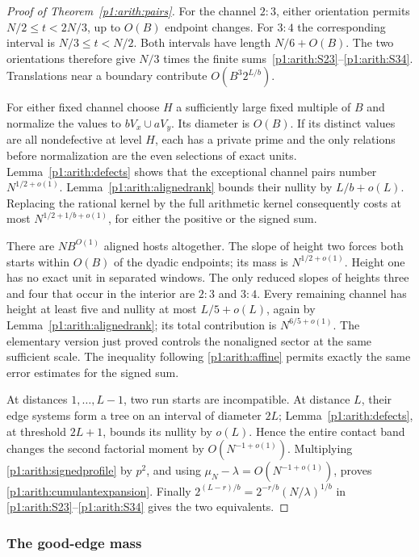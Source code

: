 \begin{proof}[Proof of Theorem~\ref{p1:arith:pairs}]
For the channel $2:3$, either orientation permits
$N/2\leq t<2N/3$, up to $O(B)$ endpoint changes.  For $3:4$ the corresponding
interval is $N/3\leq t<N/2$.  Both intervals have length $N/6+O(B)$.
The two orientations therefore give $N/3$ times the finite sums~\eqref{p1:arith:S23}--\eqref{p1:arith:S34}.
Translations near a boundary contribute $O(B^3 2^{L/b})$.

For either fixed channel choose $H$ a sufficiently large fixed multiple of
$B$ and normalize the values to $bV_x\cup aV_y$.  Its diameter is $O(B)$.
If its distinct values are all nondefective at level $H$, each has a private
prime and the only relations before normalization are the even selections
of exact units.  Lemma~\ref{p1:arith:defects} shows that the exceptional
channel pairs number $N^{1/2+o(1)}$.  Lemma~\ref{p1:arith:alignedrank} bounds
their nullity by $L/b+o(L)$.  Replacing the rational kernel by the full
arithmetic kernel consequently costs at most
$N^{1/2+1/b+o(1)}$, for either the positive or the signed sum.

There are $N B^{O(1)}$ aligned hosts altogether.  The slope of height two
forces both starts within $O(B)$ of the dyadic endpoints; its mass is
$N^{1/2+o(1)}$.  Height one has no exact unit in separated windows.
The only reduced slopes of heights three and four that occur in the interior
are $2:3$ and $3:4$.  Every remaining channel has height at least five and
nullity at most $L/5+o(L)$, again by Lemma~\ref{p1:arith:alignedrank}; its
total contribution is $N^{6/5+o(1)}$. The elementary version just
proved controls the nonaligned sector at the same sufficient scale.
The inequality following
\eqref{p1:arith:affine} permits exactly the same error estimates for the signed
sum.

At distances $1,\ldots,L-1$, two run starts are incompatible.  At distance
$L$, their edge systems form a tree on an interval of diameter $2L$;
Lemma~\ref{p1:arith:defects}, at threshold $2L+1$, bounds its nullity by
$o(L)$.  Hence the entire contact band changes the second factorial moment
by $O(N^{-1+o(1)})$.  Multiplying \eqref{p1:arith:signedprofile} by $p^2$,
and using $\mu_N-\lambda=O(N^{-1+o(1)})$, proves
\eqref{p1:arith:cumulantexpansion}.  Finally
$2^{(L-r)/b}=2^{-r/b}(N/\lambda)^{1/b}$ in
\eqref{p1:arith:S23}--\eqref{p1:arith:S34} gives the two equivalents.
\end{proof}

\subsubsection{The good-edge mass}
\label{p14:comp:good-edge-mass}

